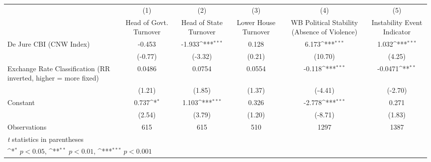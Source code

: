 {
\def\sym#1{\ifmmode^{#1}\else\(^{#1}\)\fi}
\begin{tabular*}{\linewidth}{@{\hskip\tabcolsep\extracolsep\fill}l*{5}{c}}
\toprule
                &\multicolumn{1}{c}{(1)}&\multicolumn{1}{c}{(2)}&\multicolumn{1}{c}{(3)}&\multicolumn{1}{c}{(4)}&\multicolumn{1}{c}{(5)}\\
                &\multicolumn{1}{c}{Head of Govt. Turnover}&\multicolumn{1}{c}{Head of State Turnover}&\multicolumn{1}{c}{Lower House Turnover}&\multicolumn{1}{c}{WB Political Stability (Absence of Violence)}&\multicolumn{1}{c}{Instability Event Indicator}\\
\midrule
De Jure CBI (CNW Index)&   -0.453         &   -1.933\sym{***}&    0.128         &    6.173\sym{***}&    1.032\sym{***}\\
                &  (-0.77)         &  (-3.32)         &   (0.21)         &  (10.70)         &   (4.25)         \\
\addlinespace
Exchange Rate Classification (RR inverted, higher = more fixed)&   0.0486         &   0.0754         &   0.0554         &   -0.118\sym{***}&  -0.0471\sym{**} \\
                &   (1.21)         &   (1.85)         &   (1.37)         &  (-4.41)         &  (-2.70)         \\
\addlinespace
Constant        &    0.737\sym{*}  &    1.103\sym{***}&    0.326         &   -2.778\sym{***}&    0.271         \\
                &   (2.54)         &   (3.79)         &   (1.20)         &  (-8.71)         &   (1.83)         \\
\midrule
Observations    &      615         &      615         &      510         &     1297         &     1387         \\
\bottomrule
\multicolumn{6}{l}{\footnotesize \textit{t} statistics in parentheses}\\
\multicolumn{6}{l}{\footnotesize \sym{*} \(p<0.05\), \sym{**} \(p<0.01\), \sym{***} \(p<0.001\)}\\
\end{tabular*}
}
